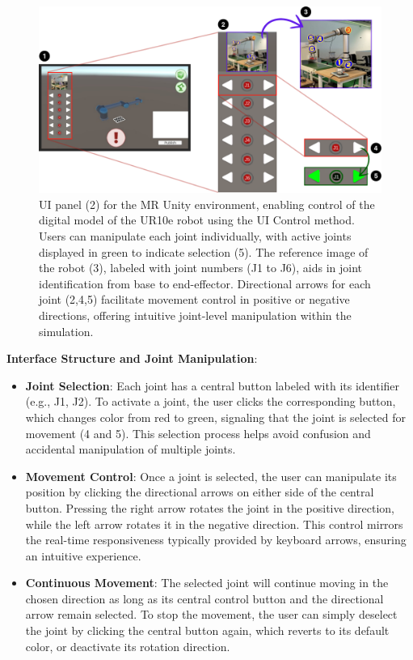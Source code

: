     \begin{figure}[h]
        \centering
        \includegraphics[width=\textwidth]{figs/interface-numerada-2.png}
        \caption{\ac{UI} panel (2) for the \ac{MR} Unity environment, enabling control of the digital model of the UR10e robot using the \ac{UI} Control method. Users can manipulate each joint individually, with active joints displayed in green to indicate selection (5). The reference image of the robot (3), labeled with joint numbers (J1 to J6), aids in joint identification from base to end-effector. Directional arrows for each joint (2,4,5) facilitate movement control in positive or negative directions, offering intuitive joint-level manipulation within the simulation.}
        \label{f:ui-control}
    \end{figure}

    \textbf{Interface Structure and Joint Manipulation}:
    \begin{itemize}
        \item \textbf{Joint Selection}: Each joint has a central button labeled with its identifier (e.g., J1, J2). To activate a joint, the user clicks the corresponding button, which changes color from red to green, signaling that the joint is selected for movement (4 and 5). This selection process helps avoid confusion and accidental manipulation of multiple joints.

        \item \textbf{Movement Control}: Once a joint is selected, the user can manipulate its position by clicking the directional arrows on either side of the central button. Pressing the right arrow rotates the joint in the positive direction, while the left arrow rotates it in the negative direction. This control mirrors the real-time responsiveness typically provided by keyboard arrows, ensuring an intuitive experience.

        \item \textbf{Continuous Movement}: The selected joint will continue moving in the chosen direction as long as its central control button and the directional arrow remain selected. To stop the movement, the user can simply deselect the joint by clicking the central button again, which reverts to its default color, or deactivate its rotation direction.
    \end{itemize}

